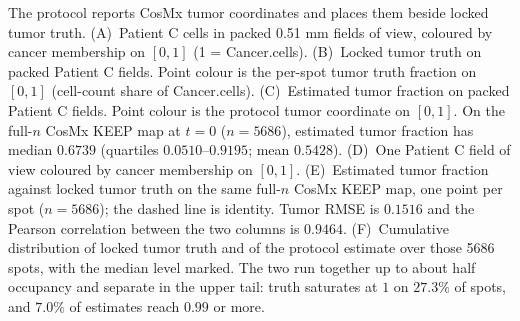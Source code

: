 The protocol reports CosMx tumor coordinates and places them beside locked tumor truth. (A)~Patient C cells in packed 0.51 mm fields of view, coloured by cancer membership on \([0,1]\) (1 = Cancer.cells). (B)~Locked tumor truth on packed Patient C fields. Point colour is the per-spot tumor truth fraction on \([0,1]\) (cell-count share of Cancer.cells). (C)~Estimated tumor fraction on packed Patient C fields. Point colour is the protocol tumor coordinate on \([0,1]\). On the full-\(n\) CosMx KEEP map at \(t=0\) (\(n=5686\)), estimated tumor fraction has median \(0.6739\) (quartiles \(0.0510\)--\(0.9195\); mean \(0.5428\)). (D)~One Patient C field of view coloured by cancer membership on \([0,1]\). (E)~Estimated tumor fraction against locked tumor truth on the same full-\(n\) CosMx KEEP map, one point per spot (\(n=5686\)); the dashed line is identity. Tumor RMSE is \(0.1516\) and the Pearson correlation between the two columns is \(0.9464\). (F)~Cumulative distribution of locked tumor truth and of the protocol estimate over those 5686 spots, with the median level marked. The two run together up to about half occupancy and separate in the upper tail: truth saturates at \(1\) on \(27.3\%\) of spots, and \(7.0\%\) of estimates reach \(0.99\) or more.
